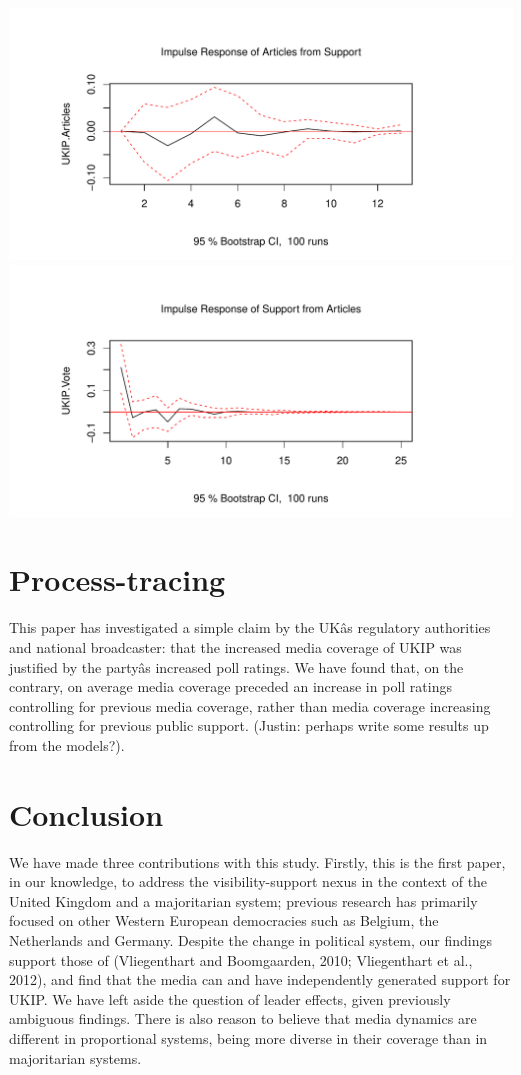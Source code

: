 \documentclass[12pt,article]{article}
\begin{document}
\includegraphics{ukip_media_files/figure-latex/unnamed-chunk-6-1.pdf}
\includegraphics{ukip_media_files/figure-latex/unnamed-chunk-6-2.pdf}

\section{Process-tracing}\label{process-tracing}

This paper has investigated a simple claim by the UKâs regulatory
authorities and national broadcaster: that the increased media coverage
of UKIP was justified by the partyâs increased poll ratings. We have
found that, on the contrary, on average media coverage preceded an
increase in poll ratings controlling for previous media coverage, rather
than media coverage increasing controlling for previous public support.
(Justin: perhaps write some results up from the models?).

\section{Conclusion}\label{conclusion}

We have made three contributions with this study. Firstly, this is the
first paper, in our knowledge, to address the visibility-support nexus
in the context of the United Kingdom and a majoritarian system; previous
research has primarily focused on other Western European democracies
such as Belgium, the Netherlands and Germany. Despite the change in
political system, our findings support those of (Vliegenthart and
Boomgaarden, 2010; Vliegenthart et al., 2012), and find that the media
can and have independently generated support for UKIP. We have left
aside the question of leader effects, given previously ambiguous
findings. There is also reason to believe that media dynamics are
different in proportional systems, being more diverse in their coverage
than in majoritarian systems.
\end{document}
